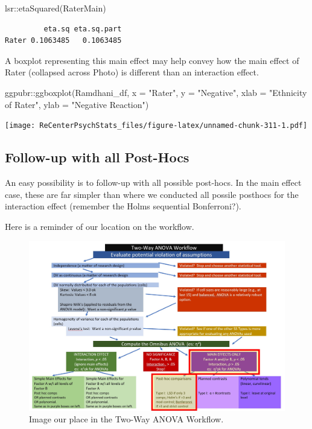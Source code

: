 \documentclass[
  11pt,
]{book}
\newenvironment{Shaded}{\begin{snugshade}}{\end{snugshade}}
\newcommand{\AttributeTok}[1]{\textcolor[rgb]{0.77,0.63,0.00}{#1}}
\newcommand{\FunctionTok}[1]{\textcolor[rgb]{0.00,0.00,0.00}{#1}}
\newcommand{\NormalTok}[1]{#1}
\newcommand{\SpecialCharTok}[1]{\textcolor[rgb]{0.00,0.00,0.00}{#1}}
\newcommand{\StringTok}[1]{\textcolor[rgb]{0.31,0.60,0.02}{#1}}
\begin{document}
\begin{Shaded}
\begin{Highlighting}[]
\NormalTok{lsr}\SpecialCharTok{::}\FunctionTok{etaSquared}\NormalTok{(RaterMain)}
\end{Highlighting}
\end{Shaded}

\begin{verbatim}
         eta.sq eta.sq.part
Rater 0.1063485   0.1063485
\end{verbatim}

A boxplot representing this main effect may help convey how the main effect of Rater (collapsed across Photo) is different than an interaction effect.

\begin{Shaded}
\begin{Highlighting}[]
\NormalTok{ggpubr}\SpecialCharTok{::}\FunctionTok{ggboxplot}\NormalTok{(Ramdhani\_df, }\AttributeTok{x =} \StringTok{"Rater"}\NormalTok{, }\AttributeTok{y =} \StringTok{"Negative"}\NormalTok{, }\AttributeTok{xlab =} \StringTok{"Ethnicity of Rater"}\NormalTok{,}
    \AttributeTok{ylab =} \StringTok{"Negative Reaction"}\NormalTok{)}
\end{Highlighting}
\end{Shaded}

\texttt{[image: ReCenterPsychStats\_files/figure-latex/unnamed-chunk-311-1.pdf]}

\hypertarget{follow-up-with-all-post-hocs}{%
\subsection{Follow-up with all Post-Hocs}\label{follow-up-with-all-post-hocs}}

An easy possibility is to follow-up with all possible post-hocs. In the main effect case, these are far simpler than where we conducted all possile posthocs for the interaction effect (remember the Holms sequential Bonferroni?).

Here is a reminder of our location on the workflow.

\begin{figure}
\centering
\includegraphics{images/factorial/wfMain_PH.jpg}
\caption{Image our place in the Two-Way ANOVA Workflow.}
\end{figure}
\end{document}
